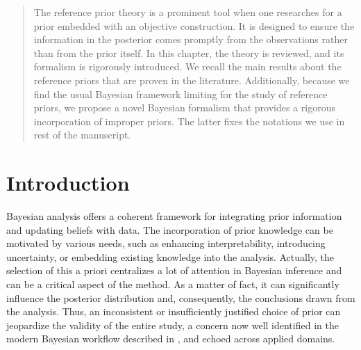 

\begin{abstract}
    The reference prior theory is a prominent tool when 
    one researches for a prior embedded with an objective construction. It is designed to ensure the information in the posterior comes promptly from the observations rather than from the prior itself.
    In this chapter, the theory is reviewed, and its formalism is rigorously introduced.
    We recall the main results about the reference priors that are proven in the literature.
    Additionally, because we find the usual Bayesian framework limiting for the study of reference priors, we propose a novel Bayesian formalism that provides a rigorous incorporation of improper priors.
    The latter fixes the notations we use in rest of the manuscript.
\end{abstract}

\minitoc


\section{Introduction}\label{sec:intro-ref:intro}

Bayesian analysis offers a coherent framework for integrating prior information and updating beliefs with data. The incorporation of prior knowledge can be motivated by various needs, such as enhancing interpretability, introducing uncertainty, or embedding existing knowledge into the analysis. Actually, the selection of this a priori centralizes a lot of attention in Bayesian inference and can be a critical aspect of the method. As a matter of fact, it can significantly influence the posterior distribution and, consequently, the conclusions drawn from the analysis. Thus, an inconsistent or insufficiently justified choice of prior can jeopardize the validity of the entire study, a concern now well identified in the modern Bayesian workflow described in \cite{gelman_bayesian_2020}, and echoed across applied domains.\\

